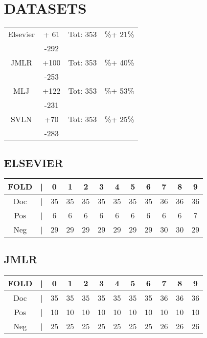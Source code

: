 \section{DATASETS}
\begin{table}[htbp]
	\centering
	\begin{tabular}{cccc}
		Elsevier & + 61 & Tot: 353 & \%+ 21\% \\
		 & -292 &  & \\
		 \hline
		 JMLR & +100 & Tot: 353 & \%+ 40\% \\
		 & -253 & & \\
 		 \hline
 		 MLJ & +122 & Tot: 353 & \%+ 53\% \\
 		 & -231 & & \\
 		 \hline
 		 SVLN & +70 & Tot: 353 & \%+ 25\% \\
 		 & -283 & & \\
		\end{tabular}%
	\label{tab:}
\end{table}
\subsection{ELSEVIER}
\begin{table}[htbp]
	\centering
		\begin{tabular}{cccccccccccc}
			FOLD &| &  0 &  1 &  2 &  3 &  4 &  5 &  6 &  7 &  8 &  9 \\ \hline
			Doc  &| & 35 & 35 & 35 & 35 & 35 & 35 & 35 & 36 & 36 & 36 \\
			Pos  &| & 6  & 6  &  6 &  6 &  6 &  6 &  6 &  6 &  6 &  7 \\
			Neg  &| & 29 & 29 & 29 & 29 & 29 & 29 & 29 & 30 & 30 & 29 \\
		\end{tabular}%
	\label{tab:Elsevier}
\end{table}
\subsection{JMLR}
\begin{table}[htbp]
	\centering
		\begin{tabular}{cccccccccccc}
			FOLD &| &  0 &  1 &  2 &  3 &  4 &  5 &  6 &  7 &  8 &  9 \\ \hline
			Doc  &| & 35 & 35 & 35 & 35 & 35 & 35 & 35 & 36 & 36 & 36 \\
			Pos  &| & 10  & 10  &  10 &  10 &  10 &  10 &  10 &  10 &  10 &  10 \\
			Neg  &| & 25 & 25 & 25 & 25 & 25 & 25 & 25 & 26 & 26 & 26 \\
		\end{tabular}%
	\label{tab:JMLR}
\end{table}
